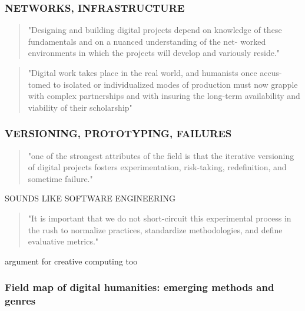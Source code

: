\subsubsection{NETWORKS, INFRASTRUCTURE}
\begin{quote}
"Designing and building digital projects depend on knowledge of these fundamentals and on a nuanced understanding of the net- worked environments in which the projects will develop and variously reside." \citep[p.17]{Burdick2012}
\end{quote}

\begin{quote}
"Digital work takes place in the real world, and humanists once accus- tomed to isolated or individualized modes of production must now grapple with complex partnerships and with insuring the long-term availability and viability of their scholarship" \citep[p.21]{Burdick2012}
\end{quote}

\subsubsection{VERSIONING, PROTOTYPING, FAILURES}
\begin{quote}
"one of the strongest attributes of the field is that the iterative versioning of digital projects fosters experimentation, risk-taking, redefinition, and sometime failure." \citep[p.21]{Burdick2012}
\end{quote}

\begin{draft}
SOUNDS LIKE SOFTWARE ENGINEERING
\end{draft}

\begin{quote}
"It is important that we do not short-circuit this experimental process in the rush to normalize practices, standardize methodologies, and define evaluative metrics." \citep[p.21]{Burdick2012}
\end{quote}

\begin{draft}
argument for creative computing too
\end{draft}

\subsubsection{Field map of digital humanities: emerging methods and genres}\citep[p.29-60]{Burdick2012}

